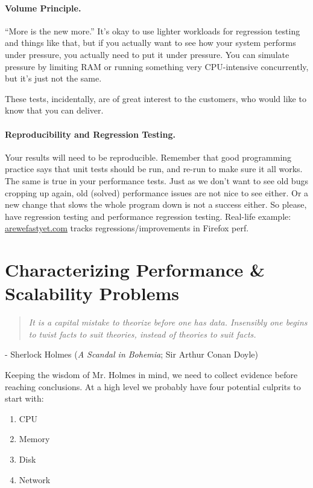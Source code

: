 \documentclass[a4paper]{report}
\begin{document}
\paragraph{Volume Principle.}
``More is the new more.'' It's okay to use lighter workloads for regression testing and things like that, but if you actually want to see how your system performs under pressure, you actually need to put it under pressure. You can simulate pressure by limiting RAM or running something very CPU-intensive concurrently, but it's just not the same.

These tests, incidentally, are of great interest to the customers, who would like to know that you can deliver. 

\paragraph{Reproducibility and Regression Testing.}
Your results will need to be reproducible. Remember that good programming practice says that unit tests should be run, and re-run to make sure it all works. The same is true in your performance tests. Just as we don't want to see old bugs cropping up again, old (solved) performance issues are not nice to see either. Or a new change that slows the whole program down is not a success either. So please, have regression testing and performance regression testing. Real-life example: \href{https://arewefastyet.com}{arewefastyet.com} tracks regressions/improvements in Firefox perf.

\section*{Characterizing Performance \& Scalability Problems}

\begin{quote}
\textit{It is a capital mistake to theorize before one has data. Insensibly one begins to twist facts to suit theories, instead of theories to suit facts.}
\end{quote}
\hfill - Sherlock Holmes (\textit{A Scandal in Bohemia}; Sir Arthur Conan Doyle)

Keeping the wisdom of Mr. Holmes in mind, we need to collect evidence before reaching conclusions. At a high level we probably have four potential culprits to start with:
\begin{enumerate}
	\item CPU
	\item Memory
	\item Disk
	\item Network
\end{enumerate}
\end{document}

